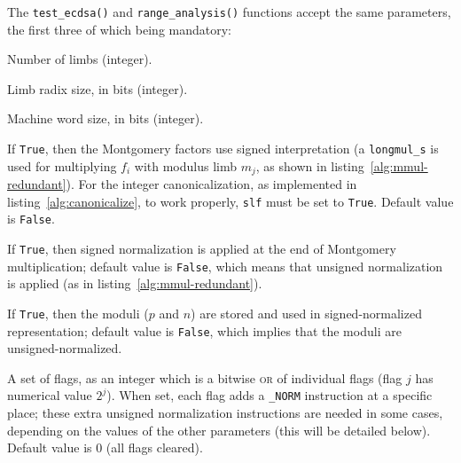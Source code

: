 \documentclass{llncs}
\begin{document}
\newenvironment{codedesc4}
    {\begin{list}
        {}
        {\setlength{\labelwidth}{3em}
         \setlength{\labelsep}{0.5em}
         \setlength{\itemsep}{1ex}
         \setlength{\leftmargin}{3.5em}
         \setlength{\rightmargin}{0em}
         \let\makelabel=\makecodedesclabel
        }
    }
    {\end{list}}

The \verb+test_ecdsa()+ and \verb+range_analysis()+ functions accept the
same parameters, the first three of which being mandatory:
\begin{codedesc4}

    \item[k] Number of limbs (integer).

    \item[s] Limb radix size, in bits (integer).

    \item[w] Machine word size, in bits (integer).

    \item[slf] If \verb+True+, then the Montgomery factors use signed
    interpretation (a \verb+longmul_s+ is used for multiplying $f_i$
    with modulus limb $m_j$, as shown in
    listing~\ref{alg:mmul-redundant}). For the integer canonicalization,
    as implemented in listing~\ref{alg:canonicalize}, to work properly,
    \verb+slf+ must be set to \verb+True+. Default value is \verb+False+.

    \item[slv] If \verb+True+, then signed normalization is applied
    at the end of Montgomery multiplication; default value is
    \verb+False+, which means that unsigned normalization is applied
    (as in listing~\ref{alg:mmul-redundant}).

    \item[slm] If \verb+True+, then the moduli ($p$ and $n$) are stored
    and used in signed-normalized representation; default value is
    \verb+False+, which implies that the moduli are unsigned-normalized.

    \item[spec] A set of flags, as an integer which is a bitwise \textsc{or}
    of individual flags (flag $j$ has numerical value $2^j$). When set,
    each flag adds a \verb+_NORM+ instruction at a specific place; these
    extra unsigned normalization instructions are needed in some cases,
    depending on the values of the other parameters (this will be
    detailed below). Default value is 0 (all flags cleared).

\end{codedesc4}
\end{document}
